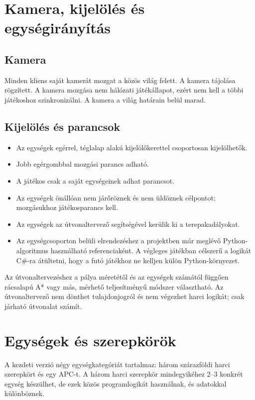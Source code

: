 \documentclass[12pt,a4paper]{article}
\begin{document}
\section{Kamera, kijelölés és egységirányítás}

\subsection{Kamera}

Minden kliens saját kamerát mozgat a közös világ felett. A kamera tájolása rögzített. A kamera mozgása nem hálózati játékállapot, ezért nem kell a többi játékoshoz szinkronizálni. A kamera a világ határain belül marad.

\subsection{Kijelölés és parancsok}

\begin{itemize}
  \item Az egységek egérrel, téglalap alakú kijelölőkerettel csoportosan kijelölhetők.
  \item Jobb egérgombbal mozgási parancs adható.
  \item A játékos csak a saját egységeinek adhat parancsot.
  \item Az egységek önállóan nem járőröznek és nem üldöznek célpontot; mozgásukhoz játékosparancs kell.
  \item Az egységek az útvonaltervező segítségével kerülik ki a terepakadályokat.
  \item Az egységcsoporton belüli elrendezéshez a projektben már meglévő Python-algoritmus használható referenciaként. A végleges játékban célszerű a logikát C\#-ra átültetni, hogy a futó játékhoz ne kelljen külön Python-környezet.
\end{itemize}

Az útvonaltervezéshez a pálya méretétől és az egységek számától függően rácsalapú A* vagy más, mérhető teljesítményű módszer választható. Az útvonaltervező nem dönthet tulajdonjogról és nem végezhet harci logikát; csak járható útvonalat számít.

\section{Egységek és szerepkörök}

A kezdeti verzió négy egységkategóriát tartalmaz: három szárazföldi harci szerepkört és egy APC-t. A három harci szerepkör mindegyikéhez 2--3 konkrét egység készülhet, de ezek közös programlogikát használnak, és adatokkal különböznek.
\end{document}
